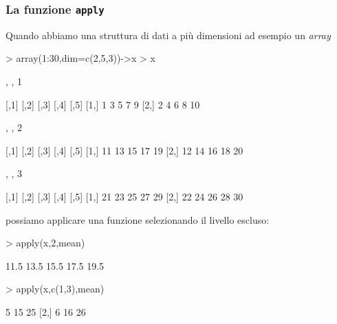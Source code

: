 \documentclass[onecolumn,12pt]{book}
\begin{document}
\subsubsection{La funzione \texttt{apply}}
Quando abbiamo una struttura di dati a pi\`u dimensioni ad esempio un \emph{array}
\begin{Schunk}
\begin{Sinput}
> array(1:30,dim=c(2,5,3))->x
> x
\end{Sinput}
\begin{Soutput}
, , 1

     [,1] [,2] [,3] [,4] [,5]
[1,]    1    3    5    7    9
[2,]    2    4    6    8   10

, , 2

     [,1] [,2] [,3] [,4] [,5]
[1,]   11   13   15   17   19
[2,]   12   14   16   18   20

, , 3

     [,1] [,2] [,3] [,4] [,5]
[1,]   21   23   25   27   29
[2,]   22   24   26   28   30
\end{Soutput}
\end{Schunk}
possiamo applicare una funzione selezionando il livello escluso:
\begin{Schunk}
\begin{Sinput}
> apply(x,2,mean)
\end{Sinput}
\begin{Soutput}
[1] 11.5 13.5 15.5 17.5 19.5
\end{Soutput}
\begin{Sinput}
> apply(x,c(1,3),mean)
\end{Sinput}
\begin{Soutput}
     [,1] [,2] [,3]
[1,]    5   15   25
[2,]    6   16   26
\end{Soutput}
\end{Schunk}
\end{document}
